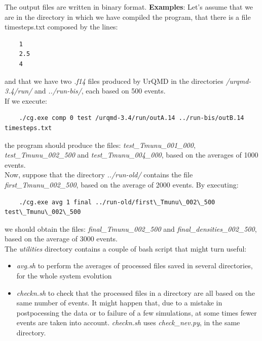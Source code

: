 \documentclass[12pt, a4paper]{article}
\begin{document}
The output files are written in binary format. 
\textbf{Examples}:
Let's assume that we are in the directory in which we have compiled the program, that there is a file timesteps.txt composed by the lines:
\begin{footnotesize}
\begin{verbatim}
	1
	2.5
	4
\end{verbatim} 
\end{footnotesize}
and that we have two \emph{.f14} files produced by UrQMD in the directories \emph{/urqmd-3.4/run/} and \emph{../run-bis/}, each based on 500 events.\\
If we execute:
\begin{footnotesize}
	\begin{verbatim}
	./cg.exe comp 0 test /urqmd-3.4/run/outA.14 ../run-bis/outB.14 timesteps.txt
	\end{verbatim}
\end{footnotesize}
the program should produce the files: \emph{test\_Tmunu\_001\_000},  \emph{test\_Tmunu\_002\_500} and  \emph{test\_Tmunu\_004\_000}, based on the averages of 1000 events.\\
Now, suppose that the directory \emph{../run-old/} contains the file \emph{first\_Tmunu\_002\_500}, based on the average of 2000 events. By executing:
\begin{footnotesize}
	\begin{verbatim}
	./cg.exe avg 1 final ../run-old/first\_Tmunu\_002\_500  test\_Tmunu\_002\_500
	\end{verbatim}
\end{footnotesize}
we should obtain the files: \emph{final\_Tmunu\_002\_500} and \emph{final\_densities\_002\_500}, based on the average of 3000 events.\\
The \emph{utilities} directory contains a couple of bash script that might turn useful:
\begin{itemize}
	\item \emph{avg.sh} to perform the averages of processed files saved in several directories, for the whole system evolution
	\item \emph{checkn.sh} to check that the processed files in a directory are all based on the same number of events. It might happen that, due to a mistake in postpocessing the data or to failure of a few simulations, at some times fewer events are taken into account. \emph{checkn.sh} uses \emph{check\_nev.py}, in the same directory.
\end{itemize}
\end{document}
